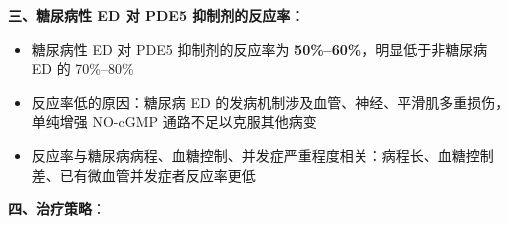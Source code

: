 \vspace{0.5em}
\noindent\textbf{三、糖尿病性 ED 对 PDE5 抑制剂的反应率}：

\begin{itemize}[leftmargin=2cm]
	\item 糖尿病性 ED 对 PDE5 抑制剂的反应率为 \textbf{50\%--60\%}，明显低于非糖尿病 ED 的 70\%--80\%
	\item 反应率低的原因：糖尿病 ED 的发病机制涉及血管、神经、平滑肌多重损伤，单纯增强 NO-cGMP 通路不足以克服其他病变
	\item 反应率与糖尿病病程、血糖控制、并发症严重程度相关：病程长、血糖控制差、已有微血管并发症者反应率更低
\end{itemize}

\vspace{0.5em}
\noindent\textbf{四、治疗策略}：

